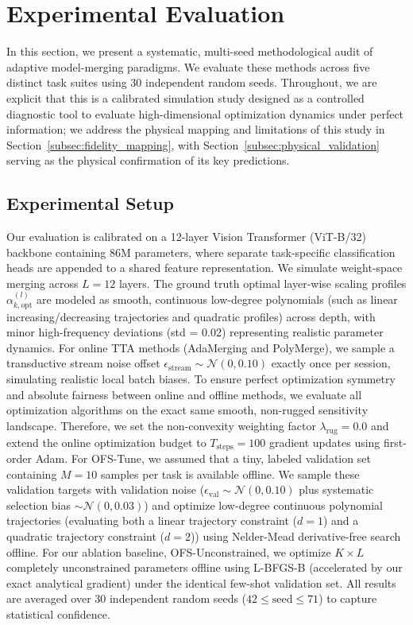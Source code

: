 \section{Experimental Evaluation}
\label{sec:experiments}

In this section, we present a systematic, multi-seed methodological audit of adaptive model-merging paradigms.
We evaluate these methods across five distinct task suites using 30 independent random seeds.
Throughout, we are explicit that this is a calibrated simulation study designed as a controlled diagnostic tool to evaluate high-dimensional optimization dynamics under perfect information; we address the physical mapping and limitations of this study in Section~\ref{subsec:fidelity_mapping}, with Section~\ref{subsec:physical_validation} serving as the physical confirmation of its key predictions.

\subsection{Experimental Setup}
Our evaluation is calibrated on a 12-layer Vision Transformer (ViT-B/32) backbone containing 86M parameters, where separate task-specific classification heads are appended to a shared feature representation.
We simulate weight-space merging across $L=12$ layers.
The ground truth optimal layer-wise scaling profiles $\alpha_{k, \text{opt}}^{(l)}$ are modeled as smooth, continuous low-degree polynomials (such as linear increasing/decreasing trajectories and quadratic profiles) across depth, with minor high-frequency deviations (std = 0.02) representing realistic parameter dynamics.
For online TTA methods (AdaMerging and PolyMerge), we sample a transductive stream noise offset $\epsilon_{\text{stream}} \sim \mathcal{N}(0, 0.10)$ exactly once per session, simulating realistic local batch biases.
To ensure perfect optimization symmetry and absolute fairness between online and offline methods, we evaluate all optimization algorithms on the exact same smooth, non-rugged sensitivity landscape.
Therefore, we set the non-convexity weighting factor $\lambda_{\text{rug}} = 0.0$ and extend the online optimization budget to $T_{\text{steps}} = 100$ gradient updates using first-order Adam.
For OFS-Tune, we assumed that a tiny, labeled validation set containing $M=10$ samples per task is available offline.
We sample these validation targets with validation noise ($\epsilon_{\text{val}} \sim \mathcal{N}(0, 0.10)$ plus systematic selection bias $\sim \mathcal{N}(0, 0.03)$) and optimize low-degree continuous polynomial trajectories (evaluating both a linear trajectory constraint ($d=1$) and a quadratic trajectory constraint ($d=2$)) using Nelder-Mead derivative-free search offline.
For our ablation baseline, OFS-Unconstrained, we optimize $K \times L$ completely unconstrained parameters offline using L-BFGS-B (accelerated by our exact analytical gradient) under the identical few-shot validation set.
All results are averaged over 30 independent random seeds ($42 \leq \text{seed} \leq 71$) to capture statistical confidence.

